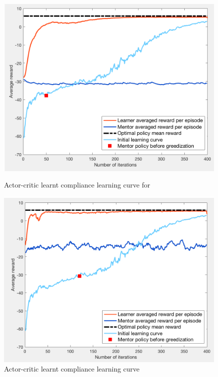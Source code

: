 \documentclass[a4paper]{report}
\begin{document}
{{{{				 \begin{figure}[ht!]
					\begin{minipage}{0.5\linewidth}
						\begin{center}
							\includegraphics[width=0.95\linewidth]{av_il_subopt_120}
							\caption{Actor-critic learnt compliance learning curve for }
							\label{fig::av_il_subopt_120}
						\end{center}
					\end{minipage}
					\begin{minipage}{0.5\linewidth}
						\begin{center}
							\includegraphics[width=0.95\linewidth]{av_il_subopt_50}
							\caption{Actor-critic learnt compliance learning curve}
							\label{fig::av_il_subopt_50}
						\end{center}
					\end{minipage}
				\end{figure}
				
}}}}
\end{document}
